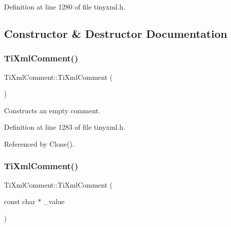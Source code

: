 Definition at line 1280 of file tinyxml.\+h.



\subsection{Constructor \& Destructor Documentation}
\hypertarget{class_ti_xml_comment_aaa3252031d3e8bd3a2bf51a1c61201b7}{}\label{class_ti_xml_comment_aaa3252031d3e8bd3a2bf51a1c61201b7} 
\subsubsection{\texorpdfstring{Ti\+Xml\+Comment()}{TiXmlComment()}\hspace{0.1cm}{\footnotesize\ttfamily [1/3]}}
{\footnotesize\ttfamily Ti\+Xml\+Comment\+::\+Ti\+Xml\+Comment (\begin{DoxyParamCaption}{ }\end{DoxyParamCaption})\hspace{0.3cm}{\ttfamily [inline]}}



Constructs an empty comment. 



Definition at line 1283 of file tinyxml.\+h.



Referenced by Clone().

\hypertarget{class_ti_xml_comment_a37e7802ef17bc03ebe5ae79bf0713d47}{}\label{class_ti_xml_comment_a37e7802ef17bc03ebe5ae79bf0713d47} 
\subsubsection{\texorpdfstring{Ti\+Xml\+Comment()}{TiXmlComment()}\hspace{0.1cm}{\footnotesize\ttfamily [2/3]}}
{\footnotesize\ttfamily Ti\+Xml\+Comment\+::\+Ti\+Xml\+Comment (\begin{DoxyParamCaption}\item[{const char $\ast$}]{\+\_\+value }\end{DoxyParamCaption})\hspace{0.3cm}{\ttfamily [inline]}}



